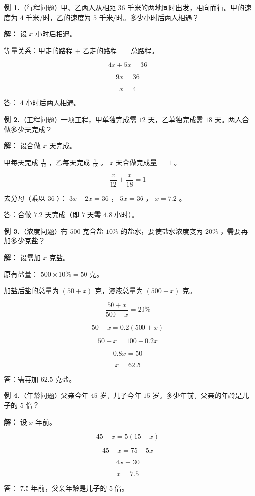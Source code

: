 \begin{workedexamples}


\textbf{例 1.}（行程问题）甲、乙两人从相距 $36$ 千米的两地同时出发，相向而行。甲的速度为 $4$ 千米/时，乙的速度为 $5$ 千米/时。多少小时后两人相遇？

\textbf{解：} 设 $x$ 小时后相遇。

等量关系：甲走的路程 $+$ 乙走的路程 $=$ 总路程。

\[
4x + 5x = 36
\]


\[
9x = 36
\]


\[
x = 4
\]


答： $4$ 小时后两人相遇。

\textbf{例 2.}（工程问题）一项工程，甲单独完成需 $12$ 天，乙单独完成需 $18$ 天。两人合做多少天完成？

\textbf{解：} 设合做 $x$ 天完成。

甲每天完成 $\frac{1}{12}$ ，乙每天完成 $\frac{1}{18}$ 。 $x$ 天合做完成量 $= 1$ 。

\[
\frac{x}{12} + \frac{x}{18} = 1
\]


去分母（乘以 $36$ ）： $3x + 2x = 36$ ， $5x = 36$ ， $x = 7.2$ 。

答：合做 $7.2$ 天完成（即 $7$ 天零 $4.8$ 小时）。

\textbf{例 3.}（浓度问题）有 $500$ 克含盐 $10\%$ 的盐水，要使盐水浓度变为 $20\%$ ，需要再加多少克盐？

\textbf{解：} 设需加 $x$ 克盐。

原有盐量： $500 \times 10\% = 50$ 克。

加盐后盐的总量为 $(50 + x)$ 克，溶液总量为 $(500 + x)$ 克。

\[
\frac{50 + x}{500 + x} = 20\%
\]


\[
50 + x = 0.2(500 + x)
\]


\[
50 + x = 100 + 0.2x
\]


\[
0.8x = 50
\]


\[
x = 62.5
\]


答：需再加 $62.5$ 克盐。

\textbf{例 4.}（年龄问题）父亲今年 $45$ 岁，儿子今年 $15$ 岁。多少年前，父亲的年龄是儿子的 $5$ 倍？

\textbf{解：} 设 $x$ 年前。

\[
45 - x = 5(15 - x)
\]


\[
45 - x = 75 - 5x
\]


\[
4x = 30
\]


\[
x = 7.5
\]


答： $7.5$ 年前，父亲年龄是儿子的 $5$ 倍。

\end{workedexamples}

